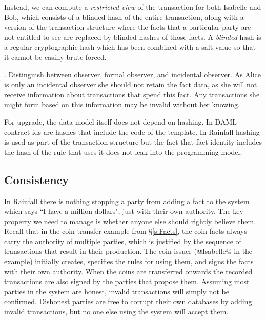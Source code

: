 Instead, we can compute a \emph{restricted view} of the transaction for both Isabelle and Bob, which consists of a blinded hash of the entire transaction, along with a version of the transaction structure where the facts that a particular party are not entitled to see are replaced by blinded hashes of those facts. A \emph{blinded} hash is a regular cryptographic hash which has been combined with a salt value so that it cannot be easilly brute forced.

. Distinguish between observer, formal observer, and incidental observer. As Alice is only an incidental observer she should not retain the fact data, as she will not receive information about transactions that spend this fact. Any transactions she might form based on this information may be invalid without her knowing.


For upgrade, the data model itself does not depend on hashing. In DAML contract ids are hashes that include the code of the template. In Rainfall hashing is used as part of the transaction structure but the fact that fact identity includes the hash of the rule that uses it does not leak into the programming model.


\subsection{Consistency}
In Rainfall there is nothing stopping a party from adding a fact to the system which says ``I have a million dollars", just with their own authority. The key property we need to manage is whether anyone else should rightly believe them. Recall that in the coin transfer example from \S\ref{s:Facts}, the coin facts always carry the authority of multiple parties, which is justified by the sequence of transactions that result in their production. The coin issuer (@Isabelle@ in the example) initially creates, specifies the rules for using them, and signs the facts with their own authority. When the coins are transferred onwards the recorded transactions are also signed by the parties that propose them. Assuming most parties in the system are honest, invalid transactions will simply not be confirmed. Dishonest parties are free to corrupt their own databases by adding invalid transactions, but no one else using the system will accept them.




